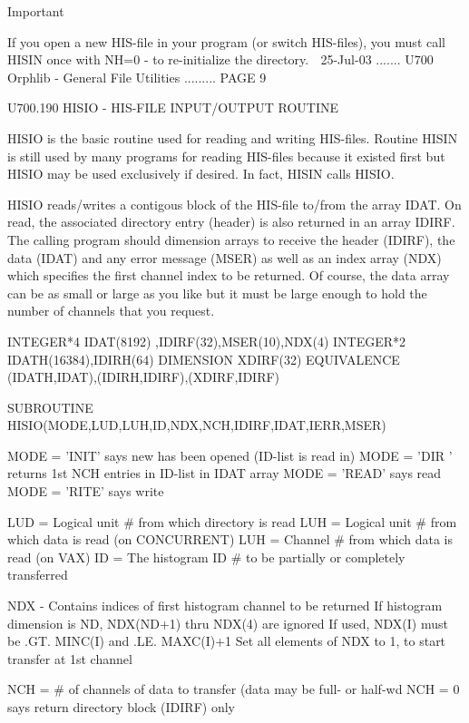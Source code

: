                                     Important
 
   If  you open a new HIS-file in your program (or switch HIS-files), you must
   call HISIN once with NH=0 - to re-initialize the directory.
    
   25-Jul-03 ....... U700  Orphlib - General File Utilities ......... PAGE   9
 
 
   U700.190  HISIO    - HIS-FILE INPUT/OUTPUT ROUTINE
 
   HISIO is the basic routine used for reading and writing HIS-files.  Routine
   HISIN  is  still  used  by  many  programs for reading HIS-files because it
   existed first but HISIO may be used exclusively if desired. In fact,  HISIN
   calls HISIO.
 
   HISIO  reads/writes  a  contigous  block  of the HIS-file to/from the array
   IDAT. On read, the associated directory entry (header) is also returned  in
   an  array IDIRF. The calling program should dimension arrays to receive the
   header (IDIRF), the data (IDAT) and any error message (MSER) as well as  an
   index  array  (NDX) which specifies the first channel index to be returned.
   Of course, the data array can be as small or large as you like but it  must
   be large enough to hold the number of channels that you request.
 
          INTEGER*4 IDAT(8192)  ,IDIRF(32),MSER(10),NDX(4)
          INTEGER*2 IDATH(16384),IDIRH(64)
          DIMENSION XDIRF(32)
          EQUIVALENCE (IDATH,IDAT),(IDIRH,IDIRF),(XDIRF,IDIRF)
 
          SUBROUTINE HISIO(MODE,LUD,LUH,ID,NDX,NCH,IDIRF,IDAT,IERR,MSER)
 
   MODE = 'INIT' says new has been opened (ID-list is read in)
   MODE = 'DIR ' returns 1st NCH entries in ID-list in IDAT array
   MODE = 'READ' says read
   MODE = 'RITE' says write
 
   LUD  = Logical unit # from which directory is read
   LUH  = Logical unit # from which data is read (on CONCURRENT)
   LUH  = Channel #      from which data is read (on VAX)
   ID   = The histogram ID # to be partially or completely transferred
 
   NDX  - Contains indices of first histogram channel to be returned
          If histogram dimension is ND, NDX(ND+1) thru NDX(4) are ignored
          If used, NDX(I) must be .GT. MINC(I) and .LE. MAXC(I)+1
          Set all elements of NDX to 1, to start transfer at 1st channel
 
   NCH  = # of channels of data to transfer (data may be full- or half-wd
   NCH  = 0 says return directory block (IDIRF) only
 
